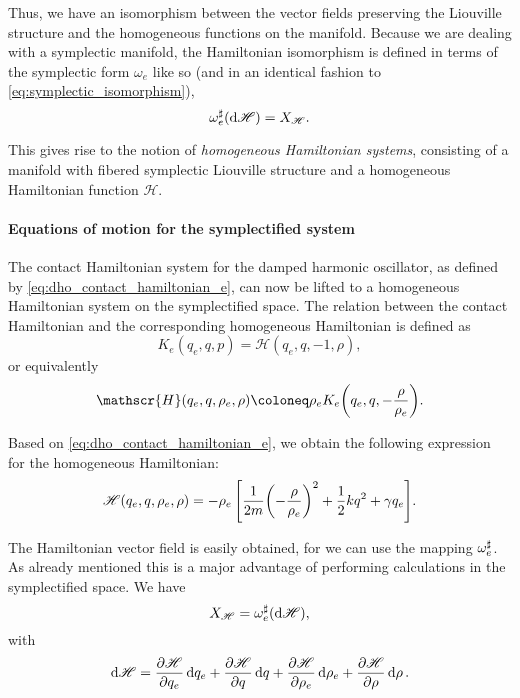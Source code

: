 Thus, we have an isomorphism between the vector fields preserving the Liouville structure and the homogeneous functions on the manifold. 
Because we are dealing with a symplectic manifold, the Hamiltonian isomorphism is defined in terms of the symplectic form \(\omega_e\) like so (and in an identical fashion to \cref{eq:symplectic_isomorphism}),
\begin{equation}
     \omega_e^\sharp(\dd{\mathscr{H}}) = X_\mathscr{H}.
\end{equation}

This gives rise to the notion of \emph{homogeneous Hamiltonian systems}, consisting of a manifold with fibered symplectic Liouville structure and a homogeneous Hamiltonian function \(\mathscr{H}\).

\paragraph{Equations of motion for the symplectified system} The contact Hamiltonian system for the damped harmonic oscillator, as defined by \cref{eq:dho_contact_hamiltonian_e}, can now be lifted to a homogeneous Hamiltonian system on the symplectified space. The relation between the contact Hamiltonian and the corresponding homogeneous Hamiltonian is defined as \cite{VanderSchaft2021a,Libermann1987,Arnold1989}
\begin{equation}
     K_e(q_e, q, p) = \mathscr{H}(q_e, q, -1, \rho),
\end{equation}
or equivalently
\begin{equation}
    \mathscr{H}(q_e, q, \rho_e, \rho) \coloneq \rho_e K_e\qty(q_e, q, -\frac{\rho}{\rho_e}).
    \label{eq:H_contact_homo}
\end{equation}

Based on \cref{eq:dho_contact_hamiltonian_e}, we obtain the following expression for the homogeneous Hamiltonian:
\begin{equation}
    \mathscr{H}(q_e, q, \rho_e, \rho) = -\rho_e\,\qty[\frac{1}{2m}\qty(-\frac{\rho}{\rho_e})^2 + \frac{1}{2}kq^2 + \gamma q_e]. 
    \label{eq:H_dho_homo}
\end{equation}

The Hamiltonian vector field is easily obtained, for we can use the mapping \(\omega_e^\sharp\). As already mentioned this is a major advantage of performing calculations in the symplectified space. We have
\begin{equation}
     X_\mathscr{H} = \omega_e^\sharp(\dd{\mathscr{H}}),
\end{equation} 
with
\begin{equation}
     \dd{\mathscr{H}} = \pdv{\mathscr{H}}{q_e}\dd{q_e} 
                      + \pdv{\mathscr{H}}{q}\dd{q}
                      + \pdv{\mathscr{H}}{\rho_e}\dd{\rho_e}
                      + \pdv{\mathscr{H}}{\rho}\dd{\rho}.
\end{equation}

